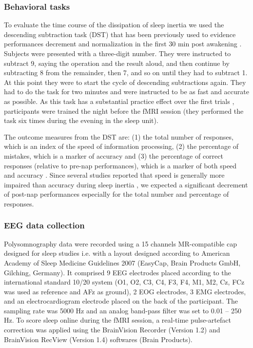 \subsubsection*{Behavioral tasks}
To evaluate the time course of the dissipation of sleep inertia we used the descending subtraction task (DST) that has been previously used to evidence performances decrement and normalization in the first 30 min post awakening \citep{dinges_assessing_1985, evans_recovery_1975, stampi_ultrashort_1990}. Subjects were presented with a three-digit number. They were instructed to subtract 9, saying the operation and the result aloud, and then continue by subtracting 8 from the remainder, then 7, and so on until they had to subtract 1. At this point they were to start the cycle of descending subtractions again. They had to do the task for two minutes and were instructed to be as fast and accurate as possible. As this task has a substantial practice effect over the first trials \citep{dinges_assessing_1985}, participants were trained the night before the fMRI session (they performed the task six times during the evening in the sleep unit).

The outcome measures from the DST are: (1) the total number of responses, which is an index of the speed of information processing, (2) the percentage of mistakes, which is a marker of accuracy and (3) the percentage of correct responses (relative to pre-nap performances), which is a marker of both speed and accuracy \citep{dinges_assessing_1985}. Since several studies reported that speed is generally more impaired than accuracy during sleep inertia \citep{trotti_waking_2016}, we expected a significant decrement of post-nap performances especially for the total number and percentage of responses.

\subsubsection*{EEG data collection}
Polysomnography data were recorded using a 15 channels MR-compatible cap designed for sleep studies i.e. with a layout designed according to American Academy of Sleep Medicine Guidelines 2007 (EasyCap, Brain Products GmbH, Gilching, Germany). It comprised 9 EEG electrodes placed according to the international standard 10/20 system (O1, O2, C3, C4, F3, F4, M1, M2, Cz, FCz was used as reference and AFz as ground), 2 EOG electrodes, 3 EMG electrodes, and an electrocardiogram electrode placed on the back of the participant. The sampling rate was 5000 Hz and an analog band-pass filter was set to 0.01 – 250 Hz. To score sleep online during the fMRI session, a real-time pulse-artefact correction was applied using the BrainVision Recorder (Version 1.2) and BrainVision RecView (Version 1.4) softwares (Brain Products).

